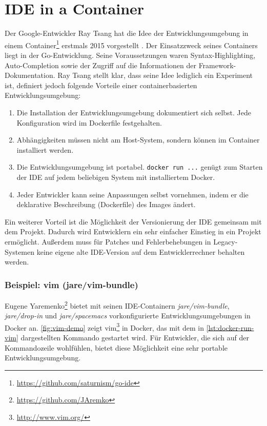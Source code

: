 \section{IDE in a Container}
\label{sec:ideinacontainer}
Der Google-Entwickler Ray Tsang hat die Idee der Entwicklungsumgebung in einem Container\footnote{\url{https://github.com/saturnism/go-ide}} erstmals 2015 vorgestellt \autocite{go-ide-in-a-container:online}.
Der Einsatzzweck seines Containers liegt in der Go-Entwicklung.
Seine Voraussetzungen waren Syntax-Highlighting, Auto-Completion sowie der Zugriff auf die Informationen der Framework-Dokumentation.
Ray Tsang stellt klar, dass seine Idee lediglich ein Experiment ist, definiert jedoch folgende Vorteile einer containerbasierten Entwicklungsumgebung:
\begin{enumerate}
    \item Die Installation der Entwicklungsumgebung dokumentiert sich selbst. Jede Konfiguration wird im Dockerfile festgehalten.
    \item Abhängigkeiten müssen nicht am Host-System, sondern können im Container installiert werden.
    \item Die Entwicklungsumgebung ist portabel. \texttt{docker run ...} genügt zum Starten der IDE auf jedem beliebigen System mit installiertem Docker.
    \item Jeder Entwickler kann seine Anpassungen selbst vornehmen, indem er die deklarative Beschreibung (Dockerfile) des Images ändert.
\end{enumerate}
Ein weiterer Vorteil ist die Möglichkeit der Versionierung der IDE gemeinsam mit dem Projekt.
Dadurch wird Entwicklern ein sehr einfacher Einstieg in ein Projekt ermöglicht.
Außerdem muss für Patches und Fehlerbehebungen in Legacy-Systemen keine eigene alte IDE-Version auf dem Entwicklerrechner behalten werden.

\subsubsection{Beispiel: vim (jare/vim-bundle)}
Eugene Yaremenko\footnote{\url{https://github.com/JAremko}} bietet mit seinen IDE-Containern \emph{jare/vim-bundle}, \emph{jare/drop-in} und \emph{jare/spacemacs} vorkonfigurierte Entwicklungsumgebungen in Docker an.
\cref{fig:vim-demo} zeigt vim\footnote{\url{http://www.vim.org/}} in Docker, das mit dem in \cref{lst:docker-run-vim} dargestellten Kommando gestartet wird.
Für Entwickler, die sich auf der Kommandozeile wohlfühlen, bietet diese Möglichkeit eine sehr portable Entwicklungsumgebung.

